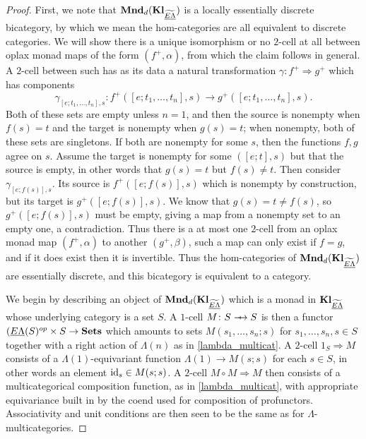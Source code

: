 \begin{proof}
First, we note that $\mathbf{Mnd}_{d}(\mathbf{Kl}_{\widetilde{\underline{E\Lambda}}})$ is a locally essentially discrete bicategory, by which we mean the hom-categories are all equivalent to discrete categories. We will show there is a unique isomorphism or no $2$-cell at all between oplax monad maps of the form $(f^{+}, \alpha)$, from which the claim follows in general. A $2$-cell between such has as its data a natural transformation $\gamma \colon f^{+} \Rightarrow g^{+}$ which has components
  \[
    \gamma_{[e; t_1, \ldots, t_n], s} \colon f^{+}([e; t_1, \ldots, t_n], s) \rightarrow g^{+}([e; t_1, \ldots, t_n], s).
  \]
Both of these sets are empty unless $n=1$, and then the source is nonempty when $f(s) = t$ and the target is nonempty when $g(s)=t$; when nonempty, both of these sets are singletons. If both are nonempty for some $s$, then the functions $f,g$ agree on $s$. Assume the target is nonempty for some $([e;t], s)$ but that the source is empty, in other words that $g(s)=t$ but $f(s) \neq t$. Then consider $\gamma_{[e;f(s)], s}$. Its source is $f^{+}([e;f(s)], s)$ which is nonempty by construction, but its target is $g^{+}([e;f(s)], s)$. We know that $g(s) = t \neq f(s)$, so $g^{+}([e;f(s)], s)$ must be empty, giving a map from a nonempty set to an empty one, a contradiction. Thus there is a at most one $2$-cell from an oplax monad map $(f^{+}, \alpha)$ to another $(g^{+}, \beta)$, such a map can only exist if $f = g$, and if it does exist then it is invertible. Thus the hom-categories of $\mathbf{Mnd}_{d}(\mathbf{Kl}_{\widetilde{\underline{E\Lambda}}})$ are essentially discrete, and this bicategory is equivalent to a category.

We begin by describing an object of $\mathbf{Mnd}_{d}(\mathbf{Kl}_{\widetilde{\underline{E\Lambda}}})$ which is a monad in $\mathbf{Kl}_{\widetilde{\underline{E\Lambda}}}$ whose underlying category is a set $S$. A $1$-cell $M \colon S \srarrow S$ is then a functor $(\underline{E\Lambda}(S)^{op} \times S \rightarrow \mathbf{Sets}$ which amounts to sets $M(s_1, \ldots, s_n; s)$ for $s_1, \ldots, s_n, s \in S$ together with a right action of $\Lambda(n)$ as in \ref{lambda_multicat}. A $2$-cell $1_{S} \Rightarrow M$ consists of a $\Lambda(1)$-equivariant function $\Lambda(1) \rightarrow M(s;s)$ for each $s \in S$, in other words an element $\textrm{id}_{s} \in M(s;s)$. A $2$-cell $M \circ M \Rightarrow M$ then consists of a multicategorical composition function, as in \ref{lambda_multicat}, with appropriate equivariance built in by the coend used for composition of profunctors. Associativity and unit conditions are then seen to be the same as for $\Lambda$-multicategories.


\end{proof}

